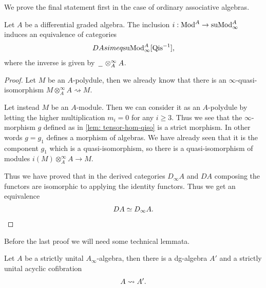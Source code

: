 \documentclass[../thesis.tex]{subfiles}
\begin{document}
            We prove the final statement first in the case of ordinary associative algebras. 

            \begin{lemma}\label{lem: derived-category-coincides}
                Let $A$ be a differential graded algebra. The inclusion $i : \tt{Mod}^A \rightarrow \tt{suMod}_\infty^A$ induces an equivalence of categories
                \begin{align*}
                    DA simeq \tt{suMod}_\infty^A[\tt{Qis}^{-1}]\tt{,}
                \end{align*}
                where the inverse is given by $\argument\otimes_A^\infty A$.
            \end{lemma}

            \begin{proof}
                Let $M$ be an $A$-polydule, then we already know that there is an $\infty$-quasi-isomorphism $M\otimes_A^\infty A \rightsquigarrow M$.

                Let instead $M$ be an $A$-module. Then we can consider it as an $A$-polydule by letting the higher multiplication $m_i = 0$ for any $i \geq 3$. Thus we see that the $\infty$-morphism $g$ defined as in \ref{lem: tensor-hom-qiso} is a strict morphism. In other words $g = g_1$ defines a morphism of algebras. We have already seen that it is the component $g_1$ which is a quasi-isomorphism, so there is a quasi-isomorphism of modules $i(M) \otimes_A^\infty A \rightarrow M$.

                Thus we have proved that in the derived categories $D_\infty A$ and $DA$ composing the functors are isomorphic to applying the identity functors. Thus we get an equivalence
                \begin{align*}
                    DA \simeq D_\infty A\tt{.}
                \end{align*}
            \end{proof}

            Before the last proof we will need some technical lemmata.

            \begin{lemma}\label{lem: reverse-minimal-model}
                Let $A$ be a strictly unital $A_\infty$-algebra, then there is a dg-algebra $A'$ and a strictly unital acyclic cofibration
                \begin{align*}
                    A \rightsquigarrow A'\tt{.}
                \end{align*}
            \end{lemma}
\end{document}

